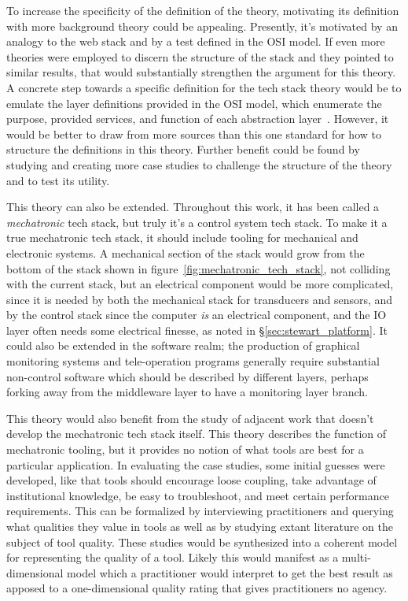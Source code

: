 \documentclass[english,12pt,a4paper,pdftex,eng,utf8]{aaltothesis}
\begin{document}
To increase the specificity of the definition of the theory, motivating its definition with more background theory could be appealing.  Presently, it's motivated by an analogy to the web stack and by a test defined in the OSI model.  If even more theories were employed to discern the structure of the stack and they pointed to similar results, that would substantially strengthen the argument for this theory.  A concrete step towards a specific definition for the tech stack theory would be to emulate the layer definitions provided in the OSI model, which enumerate the purpose, provided services, and function of each abstraction layer~\cite[§7]{ISO7498-1}.  However, it would be better to draw from more sources than this one standard for how to structure the definitions in this theory.  Further benefit could be found by studying and creating more case studies to challenge the structure of the theory and to test its utility.

This theory can also be extended.  Throughout this work, it has been called a \textit{mechatronic} tech stack, but truly it's a control system tech stack.  To make it a true mechatronic tech stack, it should include tooling for mechanical and electronic systems.  A mechanical section of the stack would grow from the bottom of the stack shown in figure~\ref{fig:mechatronic_tech_stack}, not colliding with the current stack, but an electrical component would be more complicated, since it is needed by both the mechanical stack for transducers and sensors, and by the control stack since the computer \textit{is} an electrical component, and the IO layer often needs some electrical finesse, as noted in §\ref{sec:stewart_platform}.  It could also be extended in the software realm; the production of graphical monitoring systems and tele-operation programs generally require substantial non-control software which should be described by different layers, perhaps forking away from the middleware layer to have a monitoring layer branch.

This theory would also benefit from the study of adjacent work that doesn't develop the mechatronic tech stack itself.  This theory describes the function of mechatronic tooling, but it provides no notion of what tools are best for a particular application.  In evaluating the case studies, some initial guesses were developed, like that tools should encourage loose coupling, take advantage of institutional knowledge, be easy to troubleshoot, and meet certain performance requirements.  This can be formalized by interviewing practitioners and querying what qualities they value in tools as well as by studying extant literature on the subject of tool quality.  These studies would be synthesized into a coherent model for representing the quality of a tool.  Likely this would manifest as a multi-dimensional model which a practitioner would interpret to get the best result as apposed to a one-dimensional quality rating that gives practitioners no agency.
\end{document}
